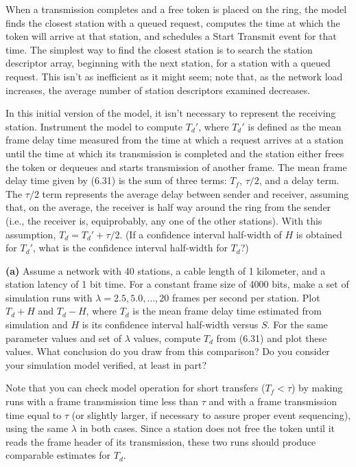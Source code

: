 When a transmission completes and a free token is placed on the ring, the model finds the closest station with a queued request, computes the time at which the token will arrive at that station, and schedules a Start Transmit event for that time. The simplest way to find the closest station is to search the station descriptor array, beginning with the next station, for a station with a queued request. This isn't as inefficient as it might seem; note that, as the network load increases, the average number of station descriptors examined decreases.

In this initial version of the model, it isn't necessary to represent the receiving station. Instrument the model to compute $T_d'$, where $T_d'$ is defined as the mean frame delay time measured from the time at which a request arrives at a station until the time at which its transmission is completed and the station either frees the token or dequeues and starts transmission of another frame. The mean frame delay time given by (6.31) is the sum of three terms: $T_f$, $\tau/2$, and a delay term. The $\tau/2$ term represents the average delay between sender and receiver, assuming that, on the average, the receiver is half way around the ring from the sender (i.e., the receiver is, equiprobably, any one of the other stations). With this assumption, $T_d=T_d'+\tau/2$. (If a confidence interval half-width of $H$ is obtained for $T_d'$, what is the confidence interval half-width for $T_d$?)

\noindent\textbf{(a)} Assume a network with 40 stations, a cable length of 1 kilometer, and a station latency of 1 bit time. For a constant frame size of 4000 bits, make a set of simulation runs with $\lambda=2.5,5.0,\ldots,20$ frames per second per station. Plot $T_d+H$ and $T_d-H$, where $T_d$ is the mean frame delay time estimated from simulation and $H$ is its confidence interval half-width versus $S$. For the same parameter values and set of $\lambda$ values, compute $T_d$ from (6.31) and plot these values. What conclusion do you draw from this comparison? Do you consider your simulation model verified, at least in part?

Note that you can check model operation for short transfers ($T_f<\tau$) by making runs with a frame transmission time less than $\tau$ and with a frame transmission time equal to $\tau$ (or slightly larger, if necessary to assure proper event sequencing), using the same $\lambda$ in both cases. Since a station does not free the token until it reads the frame header of its transmission, these two runs should produce comparable estimates for $T_d$.

